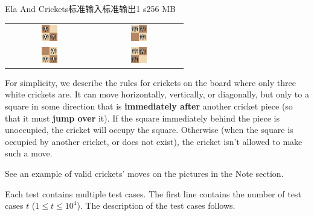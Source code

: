 \begin{problem}{Ela And Crickets}{标准输入}{标准输出}{1 s}{256 MB}
\begin{center}
\begin{tabular}{cc}
\includegraphics[width=0.2\textwidth]{problems/assets/ela2.png} & \includegraphics[width=0.2\textwidth]{problems/assets/ela3.png} \\
\includegraphics[width=0.2\textwidth]{problems/assets/ela4.png} & \includegraphics[width=0.2\textwidth]{problems/assets/ela5.png}
\end{tabular}
\end{center}

For simplicity, we describe the rules for crickets on the board where only three white crickets are. It can move horizontally, vertically, or diagonally, but only to a square in some direction that is \textbf{immediately after} another cricket piece (so that it must \textbf{jump over} it). If the square immediately behind the piece is unoccupied, the cricket will occupy the square. Otherwise (when the square is occupied by another cricket, or does not exist), the cricket isn't allowed to make such a move.

See an example of valid crickets' moves on the pictures in the Note section.

\InputFile
Each test contains multiple test cases. The first line contains the number of test cases $t$ ($1 \le t \le 10^4$). The description of the test cases follows.


\end{problem}
